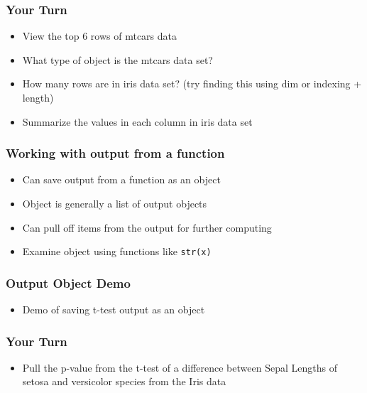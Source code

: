 \documentclass{beamer}\usepackage[]{graphicx}\usepackage[]{color}
\begin{document}

\begin{frame}
    \frametitle{Your Turn}
    \begin{itemize}
        \item View the top 6 rows of mtcars data
        \item What type of object is the mtcars data set?
        \item How many rows are in iris data set? (try finding this using dim or indexing + length)
        \item Summarize the values in each column in iris data set
    \end{itemize}    
\end{frame}


\begin{frame}
    \frametitle{Working with output from a function}
    \begin{itemize}
        \item Can save output from a function as an object
        \item Object is generally a list of output objects
        \item Can pull off items from the output for further computing
        \item Examine object using functions like \texttt{str(x)}
    \end{itemize}
\end{frame}


\begin{frame}
    \frametitle{Output Object Demo}
    \begin{itemize}
        \item Demo of saving t-test output as an object
    \end{itemize}
\end{frame}


\begin{frame}
    \frametitle{Your Turn}
    \begin{itemize}
        \item Pull the p-value from the t-test of a difference between Sepal Lengths of setosa and versicolor species from the Iris data
    \end{itemize}
\end{frame}
\end{document}
